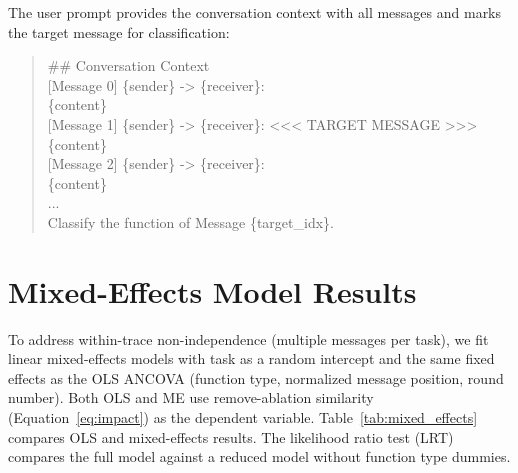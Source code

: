 \noindent The user prompt provides the conversation context with all messages and marks the target message for classification:

\begin{quote}
\small
\ttfamily
\#\# Conversation Context\\[2pt]
{[}Message 0{]} \{sender\} -> \{receiver\}:\\
\{content\}\\[2pt]
{[}Message 1{]} \{sender\} -> \{receiver\}: <<< TARGET MESSAGE >>>\\
\{content\}\\[2pt]
{[}Message 2{]} \{sender\} -> \{receiver\}:\\
\{content\}\\[2pt]
...\\[2pt]
Classify the function of Message \{target\_idx\}.
\end{quote}

\section{Mixed-Effects Model Results}
\label{app:mixed-effects}

To address within-trace non-independence (multiple messages per task), we fit linear mixed-effects models with task as a random intercept and the same fixed effects as the OLS ANCOVA (function type, normalized message position, round number). Both OLS and ME use remove-ablation similarity (Equation~\ref{eq:impact}) as the dependent variable. Table~\ref{tab:mixed_effects} compares OLS and mixed-effects results. The likelihood ratio test (LRT) compares the full model against a reduced model without function type dummies.


